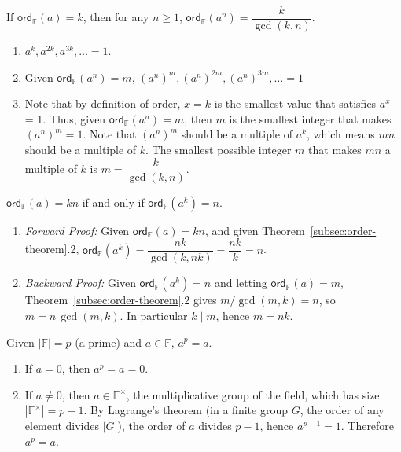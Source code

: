 \begin{tcolorbox}[title={\textbf{\tboxtheorem{\ref*{subsec:order-theorem}.2} Order Property (II)}}]
If $\textsf{ord}_{\mathbb{F}}(a) = k$, then for any $n \geq 1$, $\textsf{ord}_{\mathbb{F}}(a^n) = \dfrac{k} {\gcd(k, n)}$.
\end{tcolorbox}
\begin{myproof}
    \begin{enumerate}
    \item $a^k, a^{2k}, a^{3k}, \ldots = 1$. 
    \item Given $\textsf{ord}_{\mathbb{F}}(a^n) = m$, $(a^n)^m, (a^n)^{2m}, (a^n)^{3m}, \ldots = 1$ 
    \item Note that by definition of order, $x=k$ is the smallest value that satisfies $a^x$ = 1. Thus, given $\textsf{ord}_{\mathbb{F}}(a^n) = m$, then $m$ is the smallest integer that makes $(a^n)^m = 1$. Note that $(a^n)^m$ should be a multiple of $a^k$, which means $mn$ should be a multiple of $k$. The smallest possible integer $m$ that makes $mn$ a multiple of $k$ is $m = \dfrac{k}{\gcd(k, n)}$. 
    \end{enumerate}
\end{myproof}

\begin{tcolorbox}[title={\textbf{\tboxtheorem{\ref*{subsec:order-theorem}.3} Order Property (III)}}]
$\textsf{ord}_{\mathbb{F}}(a) = kn$ if and only if $\textsf{ord}_{\mathbb{F}}(a^k) = n$.
\end{tcolorbox}
\begin{myproof}
\begin{enumerate}
    \item \textit{Forward Proof:} Given $\textsf{ord}_{\mathbb{F}}(a) = kn$, and given Theorem~\ref*{subsec:order-theorem}.2, $\textsf{ord}_{\mathbb{F}}(a^k) = \dfrac{nk}{\gcd(k, nk)} = \dfrac{nk}{k} = n$.
    \item \textit{Backward Proof:} Given $\textsf{ord}_{\mathbb{F}}(a^k)=n$ and letting $\textsf{ord}_{\mathbb{F}}(a)=m$, Theorem~\ref*{subsec:order-theorem}.2 gives $m/\gcd(m,k)=n$, so $m=n\,\gcd(m,k)$. In particular $k\mid m$, hence $m=nk$.
\end{enumerate}
\end{myproof}

\begin{tcolorbox}[title={\textbf{\tboxtheorem{\ref*{subsec:order-theorem}.4} Fermat's Little Theorem}}]
Given $|\mathbb{F}| = p$ (a prime) and $a \in \mathbb{F}$, $a^p = a$.
\end{tcolorbox}
\begin{myproof}
    \begin{enumerate}
    \item If $a=0$, then $a^p=a=0$.
    \item If $a\ne 0$, then $a \in \mathbb{F}^{\times}$, the multiplicative group of the field, which has size $|\mathbb{F}^{\times}|=p-1$.
    By Lagrange's theorem (in a finite group $G$, the order of any element divides $|G|$), the order of $a$ divides $p-1$, hence $a^{p-1}=1$. Therefore $a^p=a$.
    \end{enumerate}
\end{myproof}